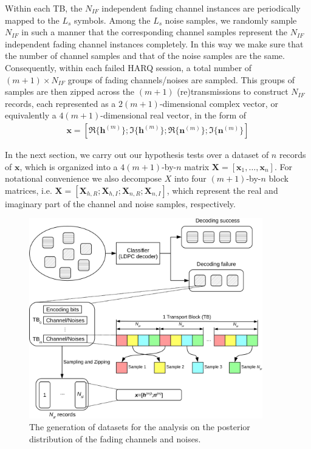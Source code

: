 \documentclass[journal,draftcls,onecolumn,12pt,twoside]{IEEEtran}
\begin{document}
Within each TB, the $N_{IF}$ independent fading
channel instances are periodically mapped to the $L_s$ symbols. Among the $L_s$
noise samples, we randomly sample $N_{IF}$ in such a manner that the
corresponding channel samples represent the $N_{IF}$ independent fading
channel instances completely. In this way we make sure that the number of
channel samples and that of the noise samples are the same. Consequently, within
each failed HARQ session, a total number of $(m+1)\times N_{IF}$ groups of
fading channels/noises are sampled. This groups of samples are then zipped across the
$(m+1)$ (re)transmissions to construct $N_{IF}$ records, each represented as a
$2(m+1)$-dimensional complex vector, or equivalently a $4(m+1)$-dimensional
real vector, in the form of
\begin{align}
  \mathbf{x} = \left[\Re\{\mathbf{h}^{(m)}\}; \Im\{\mathbf{h}^{(m)}\}; 
  \Re\{\mathbf{n}^{(m)}\}; \Im\{\mathbf{n}^{(m)}\}\right]
\end{align} 

In the next section, we carry out our hypothesis tests over a dataset of $n$
records of $\mathbf{x}$, which is organized into a  $4(m+1)$-by-$n$ matrix
$\mathbf{X} = [\mathbf{x}_1, \ldots, \mathbf{x}_n]$. For notational convenience
we also decompose $X$ into four $(m+1)$-by-$n$ block matrices, i.e.
$\mathbf{X} = [\mathbf{X}_{h,R}; \mathbf{X}_{h,I}; \mathbf{X}_{n, R};
\mathbf{X}_{n, I}]$, which represent the real and imaginary part of the channel
and noise samples, respectively.

\begin{figure}[!t]
  \centering
  \includegraphics[width=4.0in]{./figs/data.eps}
  \caption{The generation of datasets for the analysis on the posterior
  distribution of the fading channels and noises.}
  \label{fig:model}
\end{figure}
\end{document}
